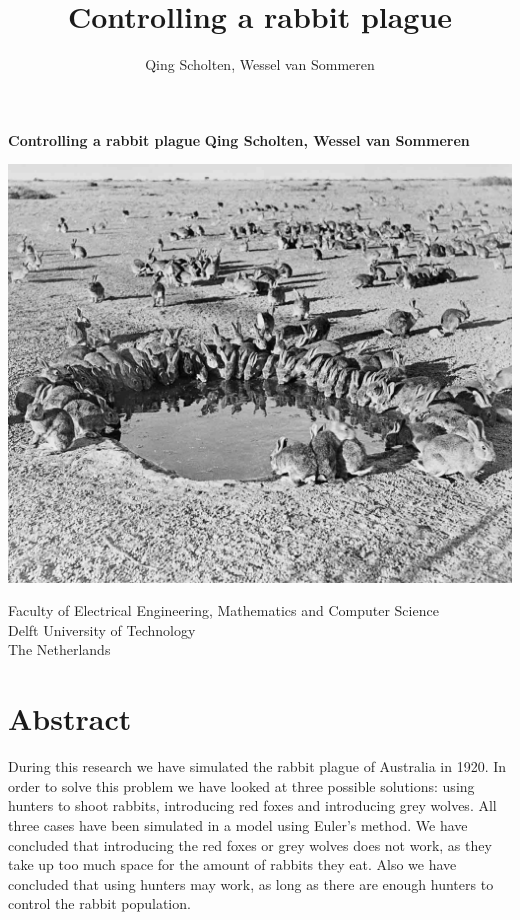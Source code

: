 \documentclass{article}
\author{Qing Scholten, Wessel van Sommeren}
\title{Controlling a rabbit plague}
\begin{document}
\begin{titlepage}
   \begin{center}
       \vspace*{1cm}

       \Huge
        \textbf{Controlling a rabbit plague}
       \vspace{1.5cm}
       \large
        \textbf{Qing Scholten, Wessel van Sommeren}
        
       \vfill
       \begin{center}
           \includegraphics[width=1\textwidth]{Pictures/Rabbits-around-the-waterhole-1400.jpg}\cite{Frontpic}
       \end{center}
       
       Faculty of Electrical Engineering, Mathematics and Computer Science\\
       Delft University of Technology\\
       The Netherlands\\
            
   \end{center}
\end{titlepage}
\tableofcontents
\newpage
\section*{Abstract}
During this research we have simulated the rabbit plague of Australia in 1920. In order to solve this problem we have looked at three possible solutions: using hunters to shoot rabbits, introducing red foxes and introducing grey wolves. All three cases have been simulated in a model using Euler's method. We have concluded that introducing the red foxes or grey wolves does not work, as they take up too much space for the amount of rabbits they eat. Also we have concluded that using hunters may work, as long as there are enough hunters to control the rabbit population.
\end{document}
